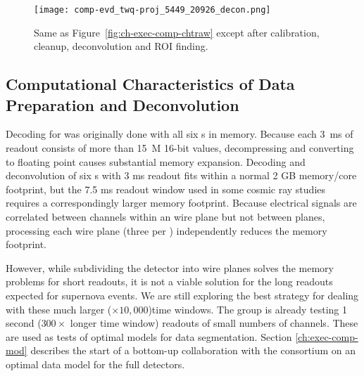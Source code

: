 \begin{figure}[t]
 \texttt{[image: comp-evd\_twq-proj\_5449\_20926\_decon.png]}
\caption{
Same as Figure~\ref{fig:ch-exec-comp-chtraw} except after calibration, cleanup, deconvolution and ROI finding. 
}
\label{fig:ch-exec-comp-chtroi}
\end{figure}

\subsection{Computational Characteristics of Data Preparation and Deconvolution }
Decoding for  was originally done with all six s in memory. Because each \SI{3}{ms} of  readout consists of more than \SI{15}{M} 16-bit values, decompressing and converting to floating point causes substantial memory expansion. 
Decoding and deconvolution of six s with 3 ms readout fits within a normal 2 GB memory/core footprint, but the 7.5 ms readout window used in some cosmic ray studies requires a correspondingly larger memory footprint. Because electrical signals are correlated between channels within an  wire plane but not between planes, processing each wire plane (three per ) independently reduces the memory footprint.  %


However,  while subdividing the detector into wire planes solves the memory problems for short readouts, it is  not a viable solution for the long readouts expected for supernova events. We are still exploring the best strategy for dealing with these much larger ($\times 10,000$)time windows. The  group is already testing 1 second ($300 \times$ longer time window) readouts of small numbers of channels.  These are used as tests of optimal models for data segmentation.  Section \ref{ch:exec-comp-mod} describes the start of a bottom-up collaboration with the  consortium on an optimal data model for the full  detectors. 

